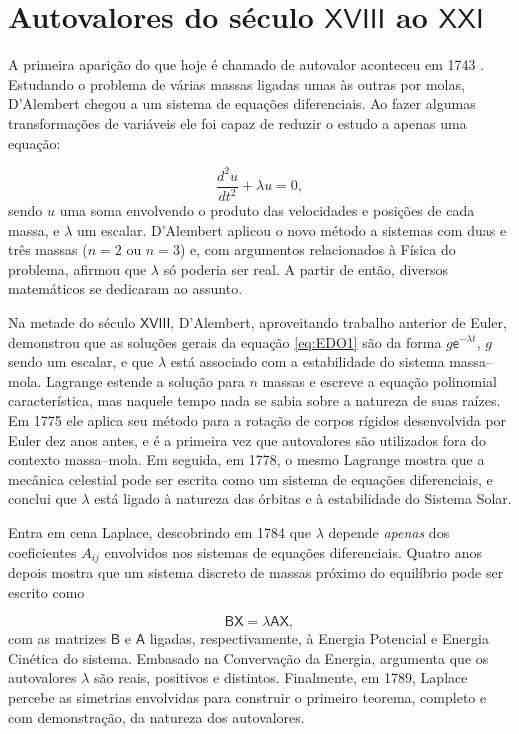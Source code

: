 \chapter{Autovalores do século $\mathsf{XVIII}$ ao $\mathsf{XXI}$}\label{apdx:historia}
	
	A primeira aparição do que hoje é chamado de autovalor aconteceu em 1743 \cite{Hawkins75}. Estudando o problema de várias massas ligadas umas às outras por molas, D'Alembert chegou a um sistema de equações diferenciais. Ao fazer algumas transformações de variáveis ele foi capaz de reduzir o estudo a apenas uma equação:

\begin{equation}\label{eq:EDO1}
	\frac{d^2u}{dt^2} + \lambda u = 0,
\end{equation}
sendo $u$ uma soma envolvendo o produto das velocidades e posições de cada massa, e $\lambda$ um escalar. D'Alembert aplicou o novo método a sistemas com duas e três massas ($n = 2$ ou $n = 3$) e, com argumentos relacionados à Física do problema, afirmou que $\lambda$ só poderia ser real. A partir de então, diversos matemáticos se dedicaram ao assunto.

	Na metade do século $\mathsf{XVIII}$, D'Alembert, aproveitando trabalho anterior de Euler, demonstrou que as soluções gerais da equação \ref{eq:EDO1} são da forma $g\mathsf{e}^{-\lambda t}$, $g$ sendo um escalar, e que $\lambda$ está associado com a estabilidade do sistema massa--mola. Lagrange estende a solução para $n$ massas e escreve a equação polinomial característica, mas naquele tempo nada se sabia sobre a natureza de suas raízes. Em 1775 ele aplica seu método para a rotação de corpos rígidos desenvolvida por Euler dez anos antes, e é a primeira vez que autovalores são utilizados fora do contexto massa--mola. Em seguida, em 1778, o mesmo Lagrange mostra que a mecânica celestial pode ser escrita como um sistema de equações diferenciais, e conclui que $\lambda$ está ligado à natureza das órbitas e à estabilidade do Sistema Solar.
	
	Entra em cena Laplace, descobrindo em 1784 que $\lambda$ depende \emph{apenas} dos coeficientes $A_{ij}$ envolvidos nos sistemas de equações diferenciais. Quatro anos depois mostra que um sistema discreto de massas próximo do equilíbrio pode ser escrito como 
	
	\begin{equation}
		\mathsf{B}\mathsf{X} = \lambda \mathsf{A}\mathsf{X},
	\end{equation}
	com as matrizes $\mathsf{B}$ e $\mathsf{A}$ ligadas, respectivamente, à Energia Potencial e Energia Cinética do sistema. Embasado na Convervação da Energia, argumenta que os autovalores $\lambda$ são reais, positivos e distintos. Finalmente, em 1789, Laplace percebe as simetrias envolvidas para construir o primeiro teorema, completo e com demonstração, da natureza dos autovalores.
	
